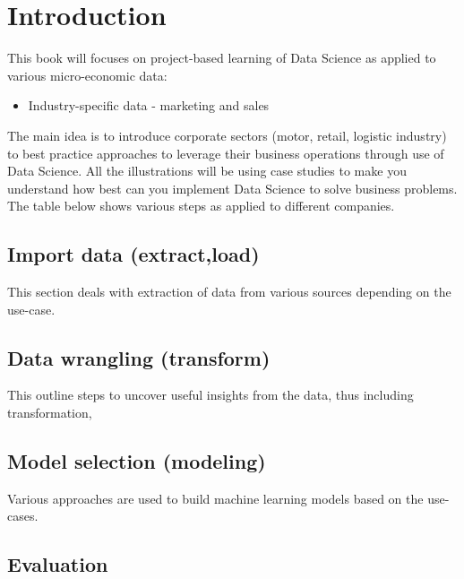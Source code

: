\documentclass[
]{book}
\providecommand{\tightlist}{%
  \setlength{\itemsep}{0pt}\setlength{\parskip}{0pt}}
\begin{document}
\hypertarget{intro}{%
\chapter{Introduction}\label{intro}}

This book will focuses on project-based learning of Data Science as applied to various micro-economic data:

\begin{itemize}
\tightlist
\item
  Industry-specific data - marketing and sales
\end{itemize}

The main idea is to introduce corporate sectors (motor, retail, logistic industry) to best practice approaches to leverage their business operations through use of Data Science. All the illustrations will be using case studies to make you understand how best can you implement Data Science to solve business problems. The table below shows various steps as applied to different companies.\citep{eddie2022}

\hypertarget{import-data-extractload}{%
\section{Import data (extract,load)}\label{import-data-extractload}}

This section deals with extraction of data from various sources depending on the use-case.

\hypertarget{data-wrangling-transform}{%
\section{Data wrangling (transform)}\label{data-wrangling-transform}}

This outline steps to uncover useful insights from the data, thus including transformation,

\hypertarget{model-selection-modeling}{%
\section{Model selection (modeling)}\label{model-selection-modeling}}

Various approaches are used to build machine learning models based on the use-cases.

\hypertarget{evaluation}{%
\section{Evaluation}\label{evaluation}}
\end{document}
